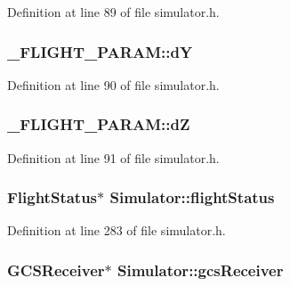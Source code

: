 Definition at line 89 of file simulator.\-h.

\hypertarget{group___h_i_t_l_plugin_ga759dc6a87e18b4ee9e44c2ab66ba767f}{
\subsubsection[{d\-Y}]{ \-\_\-\-F\-L\-I\-G\-H\-T\-\_\-\-P\-A\-R\-A\-M\-::d\-Y}}\label{group___h_i_t_l_plugin_ga759dc6a87e18b4ee9e44c2ab66ba767f}


Definition at line 90 of file simulator.\-h.

\hypertarget{group___h_i_t_l_plugin_gade2afe2cbfb8e8fe0f8d7d97e0e62076}{
\subsubsection[{d\-Z}]{ \-\_\-\-F\-L\-I\-G\-H\-T\-\_\-\-P\-A\-R\-A\-M\-::d\-Z}}\label{group___h_i_t_l_plugin_gade2afe2cbfb8e8fe0f8d7d97e0e62076}


Definition at line 91 of file simulator.\-h.

\hypertarget{group___h_i_t_l_plugin_ga2c3a29dc6471574d7182db7691e69a56}{
\subsubsection[{flight\-Status}]{\setlength{\rightskip}{0pt plus 5cm}Flight\-Status$\ast$ Simulator\-::flight\-Status\hspace{0.3cm}{\ttfamily [protected]}}}\label{group___h_i_t_l_plugin_ga2c3a29dc6471574d7182db7691e69a56}


Definition at line 283 of file simulator.\-h.

\hypertarget{group___h_i_t_l_plugin_gac63d17091bc4377e1b49696355a0ae19}{
\subsubsection[{gcs\-Receiver}]{\setlength{\rightskip}{0pt plus 5cm}G\-C\-S\-Receiver$\ast$ Simulator\-::gcs\-Receiver\hspace{0.3cm}{\ttfamily [protected]}}}\label{group___h_i_t_l_plugin_gac63d17091bc4377e1b49696355a0ae19}


